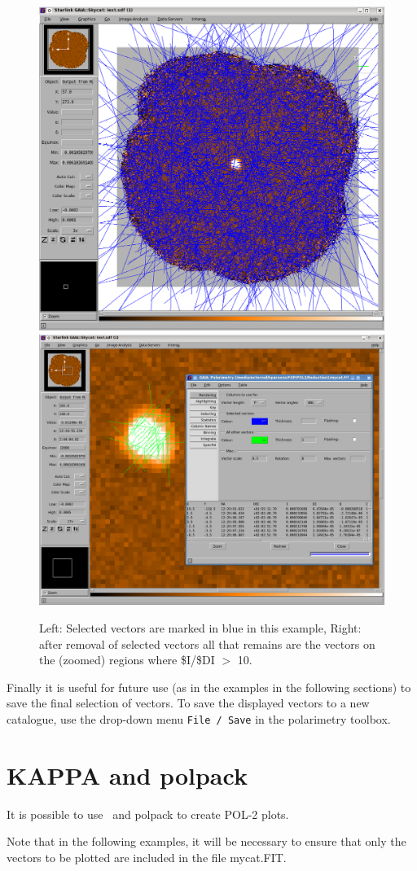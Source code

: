 \begin{figure}[t!]
\begin{center}
\includegraphics[width=0.44\linewidth]{sc22-gaia-plot-vectors-5.png}
\includegraphics[width=0.52\linewidth]{sc22-gaia-plot-vectors-7.png}
\caption [Over Plotting Vectors in GAIA]{ Left: Selected vectors are
  marked in blue in this example, Right: after removal of selected
  vectors all that remains are the vectors on the (zoomed) regions
  where \$I/\$DI $>$ 10.}
\label{fig:gaiavectorsfinal}
\end{center}
\end{figure}


Finally it is useful for future use (as in the examples in the
following sections) to save the final selection of vectors. To save the
displayed vectors to a new catalogue, use the drop-down menu
\texttt{File / Save} in the polarimetry toolbox.

\section{KAPPA and polpack}

It is possible to use \Kappa\ and polpack to create POL-2 plots.

\begin{terminalv}
\end{terminalv}

Note that in the following examples, it will be necessary to ensure
that only the vectors to be plotted are included in the file
mycat.FIT.

